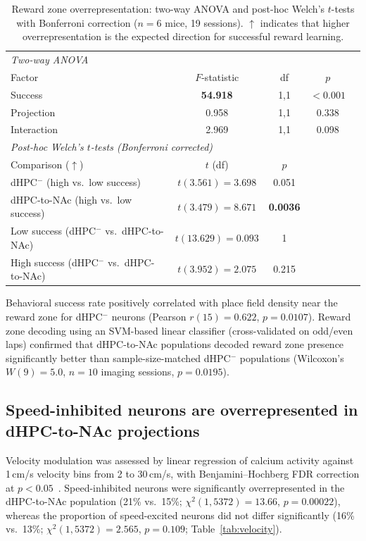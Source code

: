 \documentclass[11pt]{article}
\begin{document}
\begin{table}[H]
\centering
\caption{Reward zone overrepresentation: two-way ANOVA and post-hoc Welch's $t$-tests with Bonferroni correction ($n=6$ mice, 19 sessions). $\uparrow$ indicates that higher overrepresentation is the expected direction for successful reward learning.}
\label{tab:rewardzone}
\begin{tabular}{lcccc}
\toprule
\multicolumn{5}{l}{\textit{Two-way ANOVA}} \\
Factor & $F$-statistic & df & $p$ \\
\midrule
Success & \textbf{54.918} & 1,1 & $<0.001$ \\
Projection & 0.958 & 1,1 & 0.338 \\
Interaction & 2.969 & 1,1 & 0.098 \\
\midrule
\multicolumn{5}{l}{\textit{Post-hoc Welch's $t$-tests (Bonferroni corrected)}} \\
Comparison ($\uparrow$) & $t$ (df) & $p$ \\
\midrule
dHPC$^{-}$ (high vs.\ low success) & $t(3.561)=3.698$ & 0.051 \\
dHPC-to-NAc (high vs.\ low success) & $t(3.479)=\mathbf{8.671}$ & \textbf{0.0036} \\
Low success (dHPC$^{-}$ vs.\ dHPC-to-NAc) & $t(13.629)=0.093$ & 1 \\
High success (dHPC$^{-}$ vs.\ dHPC-to-NAc) & $t(3.952)=2.075$ & 0.215 \\
\bottomrule
\end{tabular}
\end{table}

Behavioral success rate positively correlated with place field density near the reward zone for dHPC$^{-}$ neurons (Pearson $r(15)=0.622$, $p=0.0107$). Reward zone decoding using an SVM-based linear classifier (cross-validated on odd/even laps) confirmed that dHPC-to-NAc populations decoded reward zone presence significantly better than sample-size-matched dHPC$^{-}$ populations (Wilcoxon's $W(9)=5.0$, $n=10$ imaging sessions, $p=0.0195$).

\subsection{Speed-inhibited neurons are overrepresented in dHPC-to-NAc projections}

Velocity modulation was assessed by linear regression of calcium activity against 1\,cm/s velocity bins from 2 to 30\,cm/s, with Benjamini--Hochberg FDR correction at $p<0.05$~\citep{benjamini1995}. Speed-inhibited neurons were significantly overrepresented in the dHPC-to-NAc population (21\% vs.\ 15\%; $\chi^{2}(1, 5372)=13.66$, $p=0.00022$), whereas the proportion of speed-excited neurons did not differ significantly (16\% vs.\ 13\%; $\chi^{2}(1, 5372)=2.565$, $p=0.109$; Table~\ref{tab:velocity}).
\end{document}
